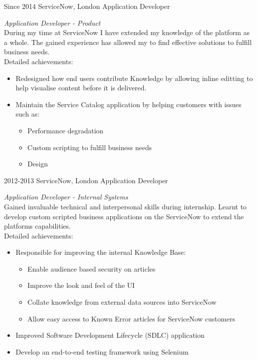\documentclass[]{friggeri-cv}
\begin{document}
\begin{entrylist}
  \entry
    {Since 2014}
    {ServiceNow, London}
    {Application Developer}
    {\emph{Application Developer - Product} \\
    During my time at ServiceNow I have extended my knowledge of the platform as a whole. The gained experience has allowed my to find effective solutions to fulfill business needs. \\
    Detailed achievements: 
    \begin{itemize}
    
        \item {Redesigned how end users contribute Knowledge by allowing inline editting to help visualise content before it is delivered.}
        \item {Maintain the Service Catalog application by helping customers with issues such as:}
        \begin{itemize}
            \item {Performance degradation}
            \item {Custom scripting to fulfill business needs}
            \item {Design}
        \end{itemize}
    \end{itemize}
    }
  \entry
    {2012-2013}
    {ServiceNow, London}
    {Application Developer}
    {\emph{Application Developer - Internal Systems} \\
    Gained invaluable technical and interpersonal skills during internship. Learnt to develop custom scripted business applications on the ServiceNow to extend the platforms capabilities. \\
    Detailed achievements:
    \begin{itemize}
        \item {Responsible for improving the internal Knowledge Base:}
             \begin{itemize}
                \item {Enable audience based security on articles}
                \item {Improve the look and feel of the UI}
                \item {Collate knowledge from external data sources into ServiceNow}
                \item {Allow easy access to Known Error articles for ServiceNow customers}
            \end{itemize}
        \item {Improved Software Development Lifecycle (SDLC) application}
        \item {Develop an end-to-end testing framework using Selenium}
    \end{itemize}
    }
\end{entrylist}
\end{document}
